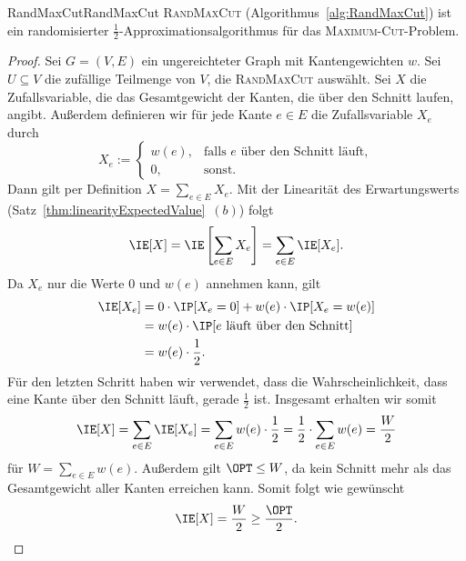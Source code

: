 \documentclass[language=ngerman,algolist]{TemplateLecture}
\begin{document}
\begin{thm}{RandMaxCut}{RandMaxCut}
    \textsc{RandMaxCut} (Algorithmus~\ref{alg:RandMaxCut}) ist ein randomisierter $\frac{1}{2}$-Approximationsalgorithmus für das \textsc{Maximum-Cut}-Problem.
\end{thm}
\begin{proof}
    Sei $G = (V, E)$ ein ungereichteter Graph mit Kantengewichten $w$. Sei $U \subseteq V$ die zufällige Teilmenge von $V$, die \textsc{RandMaxCut} auswählt. Sei $X$ die Zufallsvariable, die das Gesamtgewicht der Kanten, die über den Schnitt laufen, angibt. Außerdem definieren wir für jede Kante $e \in E$ die Zufallsvariable $X_e$ durch
    \begin{equation*}
        X_e := \begin{cases}
            w(e), & \text{falls $e$ über den Schnitt läuft}, \\
            0, & \text{sonst}.
        \end{cases}
    \end{equation*}
    Dann gilt per Definition $X = \sum_{e \in E} X_e$. Mit der Linearität des Erwartungswerts (Satz~\ref{thm:linearityExpectedValue}~$(b)$) folgt
    \begin{equation*}
        \IE[X] = \IE\left[ \sum_{e \in E} X_e \right] = \sum_{e \in E} \IE[X_e].
    \end{equation*}
    Da $X_e$ nur die Werte $0$ und $w(e)$ annehmen kann, gilt
    \begin{equation*}
        \begin{split}
            \IE[X_e] &= 0 \cdot \IP[X_e = 0] + w(e) \cdot \IP[X_e = w(e)] \\
            &= w(e) \cdot \IP[\text{$e$ läuft über den Schnitt}] \\
            &= w(e) \cdot \frac{1}{2}.
        \end{split}
    \end{equation*}
    Für den letzten Schritt haben wir verwendet, dass die Wahrscheinlichkeit, dass eine Kante über den Schnitt läuft, gerade $\frac{1}{2}$ ist. Insgesamt erhalten wir somit
    \begin{equation*}
        \IE[X] = \sum_{e \in E} \IE[X_e] = \sum_{e \in E} w(e) \cdot \frac{1}{2} = \frac{1}{2} \cdot \sum_{e \in E} w(e) = \frac{W}{2}
    \end{equation*}
    für $W = \sum_{e \in E} w(e)$. Außerdem gilt $\OPT \leq W$, da kein Schnitt mehr als das Gesamtgewicht aller Kanten erreichen kann. Somit folgt wie gewünscht 
    \begin{equation*}
        \IE[X] = \frac{W}{2} \geq \frac{\OPT}{2}.
    \end{equation*}
\end{proof}
\end{document}
